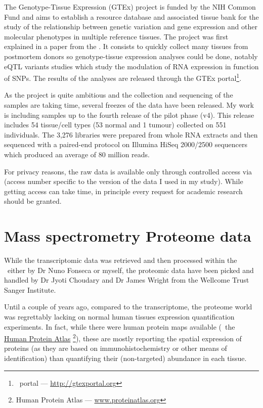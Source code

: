 The Genotype-Tissue Expression (\gls{GTEx}) project is funded by the \gls{NIH}
Common Fund and aims to establish a resource database and associated tissue bank
for the study of the relationship between genetic variation and gene expression
and other molecular phenotypes in multiple reference tissues. The project was first
explained in a paper from the \cite{GTEx2013}. It consists to quickly collect
many tissues from postmortem donors so genotype-tissue expression analyses could
be done, notably \gls{eQTL} variants studies which study the modulation
of \gls{RNA} expression in function of \glspl{SNP}. The results of the
analyses are released through the GTEx portal\footnote{\Gtex\ portal --- %
\href{http://gtexportal.org}{http://gtexportal.org}}.

As the project is quite ambitious and the collection and sequencing of the samples
are taking time, several freezes of the data have been released. My work is
including samples up to the fourth release of the pilot phase (v4). This
release includes 54 tissue/cell types (53 normal and 1 tumour)
collected on 551 individuals.
The 3,276 libraries were prepared from whole \gls{RNA} extracts and then sequenced
with a paired-end protocol on Illumina HiSeq 2000/2500 sequencers which produced
an average of 80 million reads.

For privacy reasons, the raw data is available only through controlled access via
 (access number specific to the version of the data I used
in my study). While getting access can take time, in principle every request for
academic research should be granted.

\section{Mass spectrometry Proteome data}

While the transcriptomic data was retrieved and then processed within the \EBI\
either by Dr Nuno Fonseca or myself, the proteomic data have been picked and
handled by Dr Jyoti Choudary and Dr James Wright from the Wellcome Trust
Sanger Institute.

Until a couple of years ago, compared to the transcriptome, the proteome world
was regrettably lacking on normal human tissues expression quantification
experiments. In fact, while there were human protein maps available
(\eg\ the \href{www.proteinatlas}{Human Protein Atlas}%
\footnote{Human Protein Atlas --- \href{http://www.proteinatlas.org}%
{www.proteinatlas.org}}), these
are mostly reporting the spatial expression of proteins (as they are based
on immunohistochemistry or other means of identification) than quantifying
their (non-targeted) abundance in each tissue.

